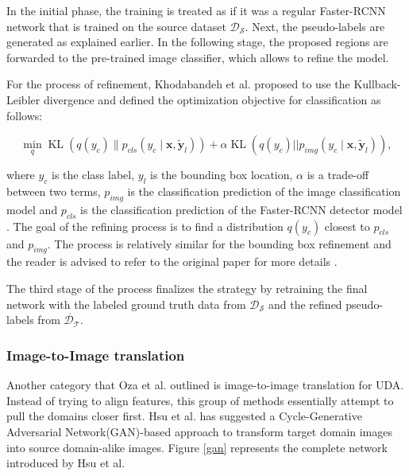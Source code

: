 In the initial phase, the training is treated as if it was a regular Faster-RCNN network that is trained on the source dataset $\mathcal{D_S}$. Next, the pseudo-labels are generated as explained earlier. In the following stage, the proposed regions are forwarded to the pre-trained image classifier, which allows to refine the model.

For the process of refinement, Khodabandeh et al. proposed to use the Kullback-Leibler divergence and defined the optimization objective for classification as follows: 

\begin{equation}
\min _{q} \operatorname{KL}\left(q\left(y_{c}\right) \| p_{c l s}\left(y_{c} \mid \boldsymbol{x}, \tilde{\boldsymbol{y}}_{l}\right)\right)+\alpha \operatorname{KL}\left(q\left(y_{c}\right)|| p_{i m g}\left(y_{c} \mid \boldsymbol{x}, \tilde{\boldsymbol{y}}_{l}\right)\right)
\label{KL_DV} 
,
\end{equation}

where $y_c$ is the class label, $y_l$ is the bounding box location, $\alpha$ is a trade-off between two terms,  $p_{img}$ is the classification prediction of the image classification model and $p_{cls}$ is the classification prediction of the Faster-RCNN detector model \cite{Khodabandeh2019}. The goal of the refining process is to find a distribution $q(y_c)$ closest to $p_{cls}$ and $p_{img}$. The process is relatively similar for the bounding box refinement and the reader is advised to refer to the original paper for more details \cite{Khodabandeh2019}.  

The third stage of the process finalizes the strategy by retraining the final network with the labeled ground truth data from $\mathcal{D_S}$ and the refined pseudo-labels from $\dot{\mathcal{D_T}}$. 
\FloatBarrier


\subsubsection{Image-to-Image translation}
\label{imagetoimage} 
Another category that Oza et al. \cite{Oza2021} outlined is image-to-image translation for UDA. Instead of trying to align features, this group of methods essentially attempt to pull the domains closer first. Hsu et al. \cite{Hsu2019} has suggested a Cycle-Generative Adversarial Network(GAN)-based approach \cite{Zhu2017} to transform target domain images into source domain-alike images. Figure \ref{gan} represents the complete network introduced by Hsu et al. 


